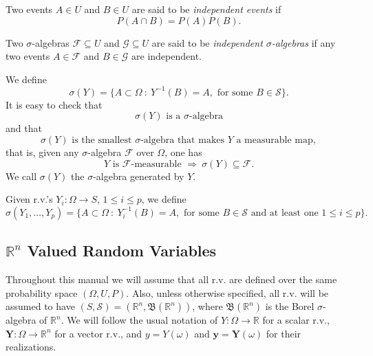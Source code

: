 Two events $A\in U$ and $B\in U$ are said to be {\it independent events} if
\begin{equation*}
P(A\cap B)=P(A)P(B).
\end{equation*}

Two $\sigma$-algebras $\mathcal{F}\subseteq U$ and $\mathcal{G}\subseteq U$ are said to be {\it independent $\sigma$-algebras} if
any two events $A\in\mathcal{F}$ and $B\in\mathcal{G}$ are independent.

We define
\begin{equation*}
\sigma(Y) = \{A\subset\Omega~:~Y^{-1}(B)=A,\text{ for some }B\in\mathcal{S}\}.
\end{equation*}
It is easy to check that
\begin{equation*}
\sigma(Y)\text{ is a }\sigma\text{-algebra}
\end{equation*}
and that
\begin{equation*}
\sigma(Y)\text{ is the smallest }\sigma\text{-algebra}\text{ that makes }Y\text{ a measurable map},
\end{equation*}
that is, given any $\sigma$-algebra $\mathcal{F}$ over $\Omega$, one has
\begin{equation}\label{eq-property-of-generated-sigma-alg}
Y\text{ is }\mathcal{F}\text{-measurable }\Rightarrow~\sigma(Y)\subseteq\mathcal{F}.
\end{equation}
We call $\sigma(Y)$ the $\sigma$-algebra generated by $Y$.

Given r.v.'s $Y_i:\Omega\rightarrow S$, $1\leqslant i\leqslant p$, we define
\begin{equation*}
\sigma(Y_1,\ldots,Y_p) = \{A\subset\Omega~:~Y_i^{-1}(B)=A,\text{ for some }B\in\mathcal{S}\text{ and at least one }1\leqslant i\leqslant p\}.
\end{equation*}

\subsection{$\mathbb{R}^n$ Valued Random Variables}

Throughout this manual we will assume that all r.v. are defined over the same probability space $(\Omega,U,P)$.
Also, unless otherwise specified, all r.v. will be assumed to have
$(S,\mathcal{S})=(\mathbb{R}^n,\mathfrak{B}(\mathbb{R}^n))$,
where $\mathfrak{B}(\mathbb{R}^n)$ is the Borel $\sigma$-algebra of $\mathbb{R}^n$.
We will follow the usual notation of
$Y:\Omega\rightarrow\mathbb{R}$ for a scalar r.v.,
$\mathbf{Y}:\Omega\rightarrow\mathbb{R}^n$ for a vector r.v.,
and $y=Y(\omega)$ and $\mathbf{y}=\mathbf{Y}(\omega)$ for their realizations.

